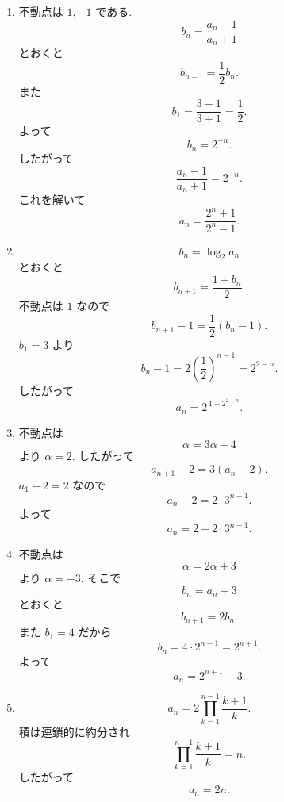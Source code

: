 \begin{enumerate}[label=\textbf{問\arabic*.},leftmargin=3.8em,format=\bookitemlink{practice-basic}{solution}{problem}]
\[          \]
              また
          \[
            a_2=1+a_1=2.
          \]
              よって全ての \(n\ge1\) について
          \[
            a_n=2^{n-1}.
          \]
        \item 不動点は \(1,-1\) である.
          \[
            b_n=\frac{a_n-1}{a_n+1}
          \]
              とおくと
          \[
            b_{n+1}
            =
            \frac12b_n.
          \]
              また
          \[
            b_1=\frac{3-1}{3+1}=\frac12.
          \]
              よって
          \[
            b_n=2^{-n}.
          \]
              したがって
          \[
            \frac{a_n-1}{a_n+1}=2^{-n}.
          \]
              これを解いて
          \[
            a_n=\frac{2^n+1}{2^n-1}.
          \]
        \item \[
            b_n=\log_2a_n
          \]
              とおくと
          \[
            b_{n+1}=\frac{1+b_n}{2}.
          \]
              不動点は \(1\) なので
          \[
            b_{n+1}-1
            =\frac12(b_n-1).
          \]
              \(b_1=3\) より
          \[
            b_n-1
            =2\left(\frac12\right)^{n-1}
            =2^{2-n}.
          \]
              したがって
          \[
            a_n=2^{\,1+2^{2-n}}.
          \]
        \item 不動点は
          \[
            \alpha=3\alpha-4
          \]
              より \(\alpha=2\).
              したがって
          \[
            a_{n+1}-2=3(a_n-2).
          \]
              \(a_1-2=2\) なので
          \[
            a_n-2=2\cdot3^{n-1}.
          \]
              よって
          \[
            a_n=2+2\cdot3^{n-1}.
          \]
        \item 不動点は
          \[
            \alpha=2\alpha+3
          \]
              より \(\alpha=-3\).
              そこで
          \[
            b_n=a_n+3
          \]
              とおくと
          \[
            b_{n+1}=2b_n.
          \]
              また \(b_1=4\) だから
          \[
            b_n=4\cdot2^{n-1}=2^{n+1}.
          \]
              よって
          \[
            a_n=2^{n+1}-3.
          \]
        \item \[
            a_n
            =2\prod_{k=1}^{n-1}\frac{k+1}{k}.
          \]
              積は連鎖的に約分され
          \[
            \prod_{k=1}^{n-1}\frac{k+1}{k}=n.
          \]
              したがって
          \[
            a_n=2n.
          \]
      \end{enumerate}


